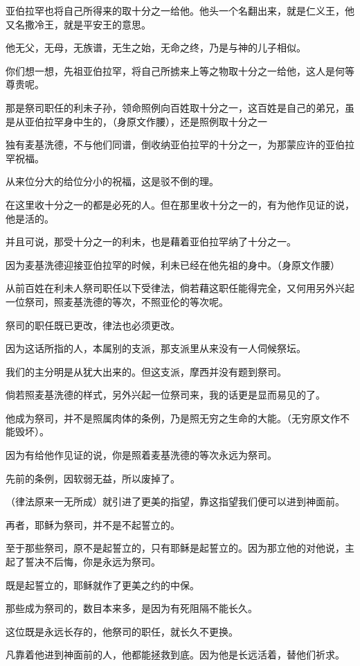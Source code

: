 \documentclass[12pt,oneside]{book}
\begin{document}
亚伯拉罕也将自己所得来的取十分之一给他。他头一个名翻出来，就是仁义王，他又名撒冷王，就是平安王的意思。

他无父，无母，无族谱，无生之始，无命之终，乃是与神的儿子相似。

你们想一想，先祖亚伯拉罕，将自己所掳来上等之物取十分之一给他，这人是何等尊贵呢。

那是祭司职任的利未子孙，领命照例向百姓取十分之一，这百姓是自己的弟兄，虽是从亚伯拉罕身中生的，（身原文作腰），还是照例取十分之一

独有麦基洗德，不与他们同谱，倒收纳亚伯拉罕的十分之一，为那蒙应许的亚伯拉罕祝福。

从来位分大的给位分小的祝福，这是驳不倒的理。

在这里收十分之一的都是必死的人。但在那里收十分之一的，有为他作见证的说，他是活的。

并且可说，那受十分之一的利未，也是藉着亚伯拉罕纳了十分之一。

因为麦基洗德迎接亚伯拉罕的时候，利未已经在他先祖的身中。（身原文作腰）

从前百姓在利未人祭司职任以下受律法，倘若藉这职任能得完全，又何用另外兴起一位祭司，照麦基洗德的等次，不照亚伦的等次呢。

祭司的职任既已更改，律法也必须更改。

因为这话所指的人，本属别的支派，那支派里从来没有一人伺候祭坛。

我们的主分明是从犹大出来的。但这支派，摩西并没有题到祭司。

倘若照麦基洗德的样式，另外兴起一位祭司来，我的话更是显而易见的了。

他成为祭司，并不是照属肉体的条例，乃是照无穷之生命的大能。（无穷原文作不能毁坏）。

因为有给他作见证的说，你是照着麦基洗德的等次永远为祭司。

先前的条例，因软弱无益，所以废掉了。

（律法原来一无所成）就引进了更美的指望，靠这指望我们便可以进到神面前。

再者，耶稣为祭司，并不是不起誓立的。

至于那些祭司，原不是起誓立的，只有耶稣是起誓立的。因为那立他的对他说，主起了誓决不后悔，你是永远为祭司。

既是起誓立的，耶稣就作了更美之约的中保。

那些成为祭司的，数目本来多，是因为有死阻隔不能长久。

这位既是永远长存的，他祭司的职任，就长久不更换。

凡靠着他进到神面前的人，他都能拯救到底。因为他是长远活着，替他们祈求。
\end{document}
